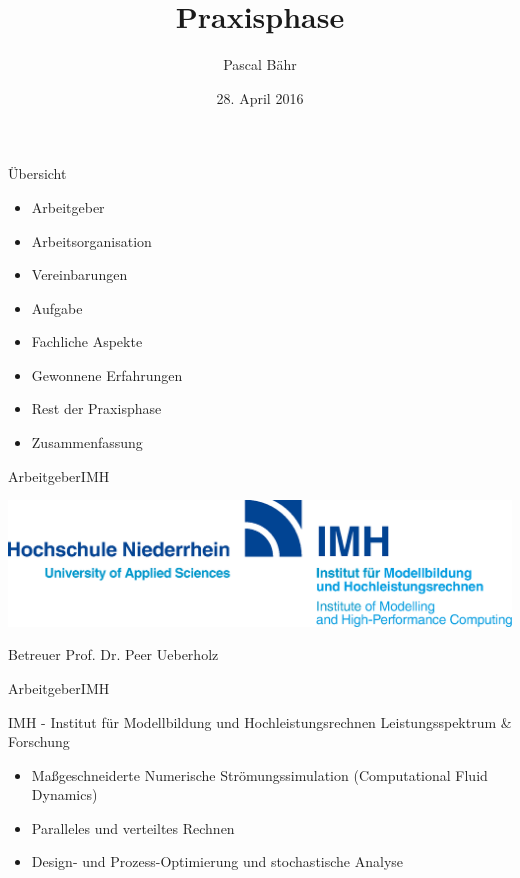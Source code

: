 \documentclass{beamer}           %
\title[Praxisphase]{Praxisphase}
\author[P. Bähr]{Pascal Bähr}
\institute{Hochschule Niederhein - Fachbereich Elektrotechnik \& Informatik}
\date{28. April 2016}
\begin{document}
\frame[plain]{\titlepage}

\begin{frame}{Übersicht}
	\begin{itemize}
		\item Arbeitgeber
		\item Arbeitsorganisation
		\item Vereinbarungen
		\item Aufgabe
		\item Fachliche Aspekte
		\item Gewonnene Erfahrungen
		\item Rest der Praxisphase
		\item Zusammenfassung
	\end{itemize}
\end{frame}

\disableLogo
\begin{frame}{Arbeitgeber}{IMH}
	\begin{center}
		\includegraphics[scale=0.4]{beamerthemeHN/imh.eps}
	\end{center}
	\begin{block}{Betreuer}
		Prof. Dr. Peer Ueberholz
	\end{block}
\end{frame}
\enableLogo

\begin{frame}{Arbeitgeber}{IMH}
	\begin{block}{IMH - Institut für Modellbildung und Hochleistungsrechnen}
		\pause
		Leistungsspektrum \& Forschung
		
		\begin{itemize}
			\item<2-> Maßgeschneiderte Numerische Strömungssimulation (Computational Fluid Dynamics)
			
			\item<3-> Paralleles und verteiltes Rechnen
			
			\item<4-> Design- und Prozess-Optimierung und stochastische Analyse
		\end{itemize}
	\end{block}	
\end{frame}
\end{document}
